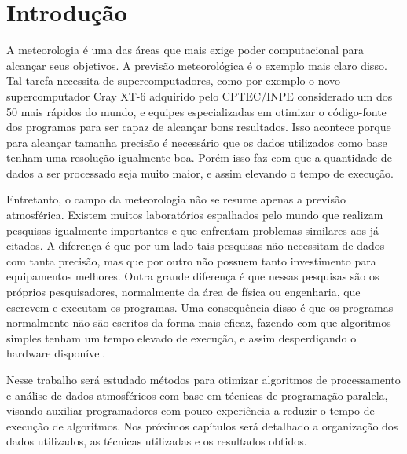\chapter{Introdução}

A meteorologia é uma das áreas que mais exige poder computacional para alcançar seus objetivos. A previsão meteorológica é o exemplo mais claro disso. Tal tarefa necessita de supercomputadores, como por exemplo o novo supercomputador Cray XT-6 adquirido pelo CPTEC/INPE considerado um dos 50 mais rápidos do mundo, e equipes especializadas em otimizar o código-fonte dos programas para ser capaz de alcançar bons resultados. Isso acontece porque para alcançar tamanha precisão é necessário que os dados utilizados como base tenham uma resolução igualmente boa. Porém isso faz com que a quantidade de dados a ser processado seja muito maior, e assim elevando o tempo de execução.

Entretanto, o campo da meteorologia não se resume apenas a previsão atmosférica. Existem muitos laboratórios espalhados pelo mundo que realizam pesquisas igualmente importantes e que enfrentam problemas similares aos já citados. A diferença é que por um lado tais pesquisas não necessitam de dados com tanta precisão, mas que por outro não possuem tanto investimento para equipamentos melhores. Outra grande diferença é que nessas pesquisas são os próprios pesquisadores, normalmente da área de física ou engenharia, que escrevem e executam os programas. Uma consequência disso é que os programas normalmente não são escritos da forma mais eficaz, fazendo com que algoritmos simples tenham um tempo elevado de execução, e assim desperdiçando o hardware disponível.

Nesse trabalho será estudado métodos para otimizar algoritmos de processamento e análise de dados atmosféricos com base em técnicas de programação paralela, visando auxiliar programadores com pouco experiência a reduzir o tempo de execução de algoritmos. Nos próximos capítulos será detalhado a organização dos dados utilizados, as técnicas utilizadas e os resultados obtidos.




